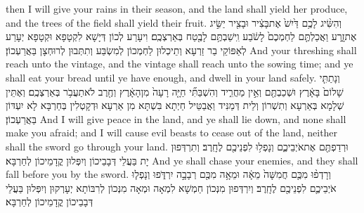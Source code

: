 {then I will give your rains in their season, and the land shall yield her produce, and the trees of the field shall yield their fruit.}{}
{וְהִשִּׂ֨יג לָכֶ֥ם דַּ֙יִשׁ֙ אֶת\maqqaf בָּצִ֔יר וּבָצִ֖יר יַשִּׂ֣יג אֶת\maqqaf זָ֑רַע וַאֲכַלְתֶּ֤ם לַחְמְכֶם֙ לָשֹׂ֔בַע וִֽישַׁבְתֶּ֥ם לָבֶ֖טַח בְּאַרְצְכֶֽם׃}
{וִיעָרַע לְכוֹן דְּיָשָׁא לִקְטָפָא וּקְטָפָא יְעָרַע לְאַפּוֹקֵי בַר זַרְעָא וְתֵיכְלוּן לַחְמְכוֹן לְמִשְׂבַּע וְתִתְּבוּן לְרוּחְצָן בַּאֲרַעְכוֹן׃}
{And your threshing shall reach unto the vintage, and the vintage shall reach unto the sowing time; and ye shall eat your bread until ye have enough, and dwell in your land safely.}{}
{וְנָתַתִּ֤י שָׁלוֹם֙ בָּאָ֔רֶץ וּשְׁכַבְתֶּ֖ם וְאֵ֣ין מַחֲרִ֑יד וְהִשְׁבַּתִּ֞י חַיָּ֤ה רָעָה֙ מִן\maqqaf הָאָ֔רֶץ וְחֶ֖רֶב לֹא\maqqaf תַעֲבֹ֥ר בְּאַרְצְכֶֽם׃}
{וְאֶתֵּין שְׁלָמָא בְּאַרְעָא וְתִשְׁרוֹן וְלֵית דְּמַנִּיד וַאֲבַטֵּיל חַיְתָא בִּשְׁתָּא מִן אַרְעָא וּדְקָטְלִין בְּחַרְבָּא לָא יִעְדּוֹן בַּאֲרַעְכוֹן׃}
{And I will give peace in the land, and ye shall lie down, and none shall make you afraid; and I will cause evil beasts to cease out of the land, neither shall the sword go through your land.}{}
{וּרְדַפְתֶּ֖ם אֶת\maqqaf אֹיְבֵיכֶ֑ם וְנָפְל֥וּ לִפְנֵיכֶ֖ם לֶחָֽרֶב׃}
{וְתִרְדְּפוּן יָת בַּעֲלֵי דְּבָבֵיכוֹן וְיִפְּלוּן קֳדָמֵיכוֹן לְחַרְבָּא׃}
{And ye shall chase your enemies, and they shall fall before you by the sword.}{}
{וְרָדְפ֨וּ מִכֶּ֤ם חֲמִשָּׁה֙ מֵאָ֔ה וּמֵאָ֥ה מִכֶּ֖ם רְבָבָ֣ה יִרְדֹּ֑פוּ וְנָפְל֧וּ אֹיְבֵיכֶ֛ם לִפְנֵיכֶ֖ם לֶחָֽרֶב׃}
{וְיִרְדְּפוּן מִנְּכוֹן חַמְשָׁא לִמְאָה וּמְאָה מִנְּכוֹן לְרִבּוֹתָא יְעָרְקוּן וְיִפְּלוּן בַּעֲלֵי דְּבָבֵיכוֹן קֳדָמֵיכוֹן לְחַרְבָּא׃}

